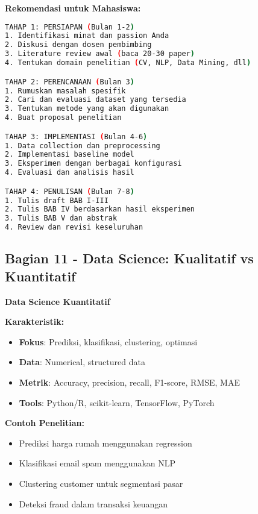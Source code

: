\textbf{Rekomendasi untuk Mahasiswa:}
\begin{lstlisting}[language=bash, style=bash, caption=Workflow yang Direkomendasikan]
TAHAP 1: PERSIAPAN (Bulan 1-2)
1. Identifikasi minat dan passion Anda
2. Diskusi dengan dosen pembimbing
3. Literature review awal (baca 20-30 paper)
4. Tentukan domain penelitian (CV, NLP, Data Mining, dll)

TAHAP 2: PERENCANAAN (Bulan 3)
1. Rumuskan masalah spesifik
2. Cari dan evaluasi dataset yang tersedia
3. Tentukan metode yang akan digunakan
4. Buat proposal penelitian

TAHAP 3: IMPLEMENTASI (Bulan 4-6)
1. Data collection dan preprocessing
2. Implementasi baseline model
3. Eksperimen dengan berbagai konfigurasi
4. Evaluasi dan analisis hasil

TAHAP 4: PENULISAN (Bulan 7-8)
1. Tulis draft BAB I-III
2. Tulis BAB IV berdasarkan hasil eksperimen
3. Tulis BAB V dan abstrak
4. Review dan revisi keseluruhan
\end{lstlisting}

\subsection*{Bagian 11 - Data Science: Kualitatif vs Kuantitatif}

\textbf{Data Science Kuantitatif}

\textbf{Karakteristik:}
\begin{itemize}
    \item \textbf{Fokus}: Prediksi, klasifikasi, clustering, optimasi
    \item \textbf{Data}: Numerical, structured data
    \item \textbf{Metrik}: Accuracy, precision, recall, F1-score, RMSE, MAE
    \item \textbf{Tools}: Python/R, scikit-learn, TensorFlow, PyTorch
\end{itemize}

\textbf{Contoh Penelitian:}
\begin{itemize}
    \item Prediksi harga rumah menggunakan regression
    \item Klasifikasi email spam menggunakan NLP
    \item Clustering customer untuk segmentasi pasar
    \item Deteksi fraud dalam transaksi keuangan
\end{itemize}

